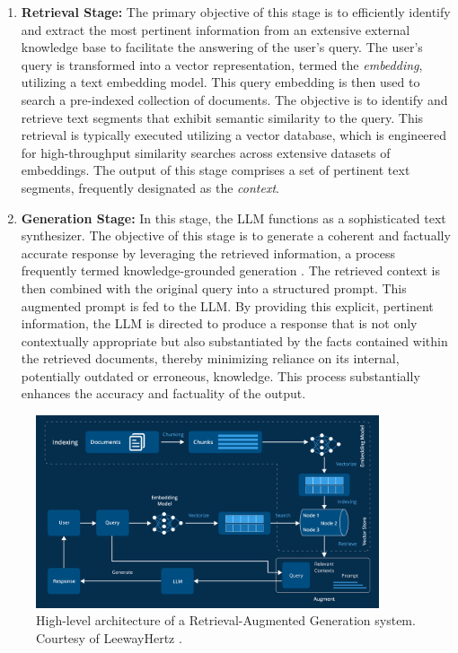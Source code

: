 \begin{enumerate}
    \item \textbf{Retrieval Stage:} The primary objective of this stage is to efficiently identify and extract the most pertinent information from an extensive external knowledge base to facilitate the answering of the user's query. The user's query is transformed into a vector representation, termed the \textit{embedding}, utilizing a text embedding model. This query embedding is then used to search a pre-indexed collection of documents. The objective is to identify and retrieve text segments that exhibit semantic similarity to the query. This retrieval is typically executed utilizing a vector database, which is engineered for high-throughput similarity searches across extensive datasets of embeddings. The output of this stage comprises a set of pertinent text segments, frequently designated as the \textit{context}.

    
    \item \textbf{Generation Stage:} In this stage, the LLM functions as a sophisticated text synthesizer. The objective of this stage is to generate a coherent and factually accurate response by leveraging the retrieved information, a process frequently termed knowledge-grounded generation \autocite{yu2022survey}. The retrieved context is then combined with the original query into a structured prompt. This augmented prompt is fed to the LLM. By providing this explicit, pertinent information, the LLM is directed to produce a response that is not only contextually appropriate but also substantiated by the facts contained within the retrieved documents, thereby minimizing reliance on its internal, potentially outdated or erroneous, knowledge. This process substantially enhances the accuracy and factuality of the output.
\end{enumerate}

\begin{figure}[!htbp]
    \centering
    \includegraphics[width=0.9\textwidth]{images/chapter2/rag_architecture_2.png}
    \caption{High-level architecture of a Retrieval-Augmented Generation system. Courtesy of LeewayHertz \autocite{leewayhertz}.}
    \label{fig:rag_architecture}
\end{figure}

